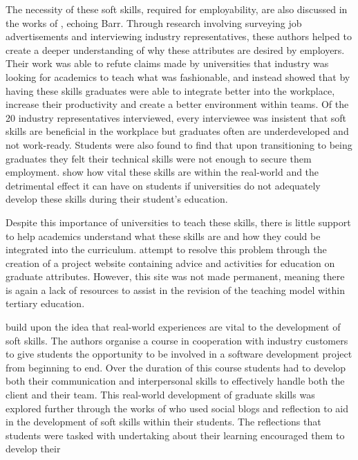 \documentclass{l4proj}
\begin{document}
The necessity of these soft skills, required for employability, are also discussed in 
the works of \citet{stevens_industry_2016}, echoing Barr. Through research involving surveying job 
advertisements and interviewing industry representatives, these authors helped to create a deeper 
understanding of why these attributes are desired by employers. Their work was able to refute 
claims made by universities that industry was looking for academics to teach what was fashionable, 
and instead showed that by having these skills graduates were able to integrate better into the 
workplace, increase their productivity and create a better environment within teams.  Of the 20 
industry representatives interviewed, every interviewee was insistent that soft skills are 
beneficial in the workplace but graduates often are underdeveloped and not work-ready. Students 
were also found to find that upon transitioning to being graduates they felt their technical skills were not enough to 
secure them employment. \citet{stevens_industry_2016} show how vital these skills are within the real-world and the 
detrimental effect it can have on students if universities do not adequately develop these skills 
during their student's education.
\par 
Despite this importance of universities to teach these skills, there is little support to 
help academics understand what these skills are and how they could be integrated into the curriculum.
\citet{litchfield_contextualising_2010} attempt to resolve this problem through the creation of a project website 
containing advice and activities for education on graduate attributes. However, this site was not 
made permanent, meaning there is again a lack of resources to assist in the revision of the 
teaching model within tertiary education.
\par 
\citet{abernethy_teaching_2009} build upon the idea that real-world experiences are vital to the 
development of soft skills. The authors organise a course in cooperation with industry customers 
to give students the opportunity to be involved in a software development project from beginning 
to end. Over the duration of this course students had to develop both their communication and 
interpersonal skills to effectively handle both the client and their team. This real-world 
development of graduate skills was explored further through the works of \citet{mcdermott_developing_nodate} who 
used social blogs and reflection to aid in the development of soft skills within their students. The reflections 
that students were tasked with undertaking about their learning encouraged them to develop their 
\end{document}
